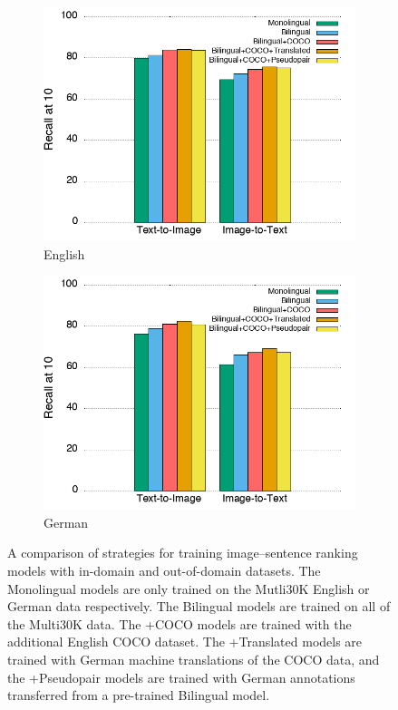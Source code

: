 \begin{figure}
  \begin{subfigure}[b]{0.5\textwidth}
    \includegraphics[width=1\textwidth]{assets/best_en_models}
    \caption{English}
  \end{subfigure}%
  \begin{subfigure}[b]{0.5\textwidth}
    \includegraphics[width=1\textwidth]{assets/best_de_models}
    \caption{German}
  \end{subfigure}
  \caption{A comparison of strategies for training image--sentence ranking models with in-domain and out-of-domain datasets. The Monolingual models are only trained on the Mutli30K English or German data respectively. The Bilingual models are trained on all of the Multi30K data. The +COCO models are trained with the additional English COCO dataset. The +Translated models are trained with German machine translations of the COCO data, and the +Pseudopair models are trained with German annotations transferred from a pre-trained Bilingual model.}
\end{figure}

